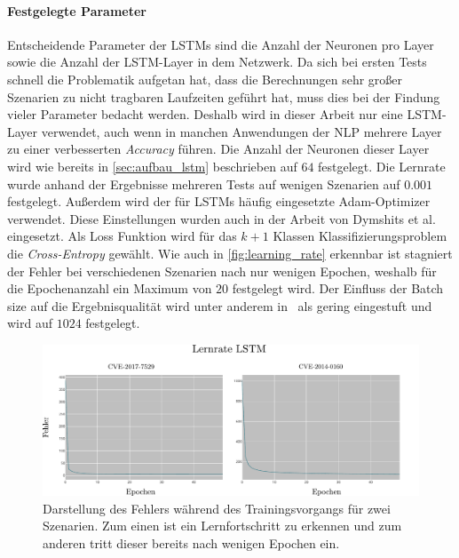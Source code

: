             \paragraph{Festgelegte Parameter}
                Entscheidende Parameter der \acp{LSTM} sind die Anzahl der Neuronen pro Layer sowie die Anzahl der \ac{LSTM}-Layer in dem Netzwerk.
                Da sich bei ersten Tests schnell die Problematik aufgetan hat, dass die Berechnungen sehr großer Szenarien zu nicht tragbaren Laufzeiten geführt hat, muss dies bei der Findung vieler Parameter bedacht werden.
                Deshalb wird in dieser Arbeit nur eine \ac{LSTM}-Layer verwendet, auch wenn in manchen Anwendungen der \ac{NLP} mehrere Layer zu einer verbesserten \textit{Accuracy} führen.\cite{LSTMHYPERAUFA2020}
                Die Anzahl der Neuronen dieser Layer wird wie bereits in \autoref{sec:aufbau_lstm} beschrieben auf $64$ festgelegt.
                Die Lernrate wurde anhand der Ergebnisse mehreren Tests auf wenigen Szenarien auf $0.001$ festgelegt.
                Außerdem wird der für \acp{LSTM} häufig eingesetzte Adam-Optimizer verwendet.
                Diese Einstellungen wurden auch in der Arbeit von Dymshits et al.~\cite{LSTMDYMSHITS2017} eingesetzt.
                Als Loss Funktion wird für das $k+1$ Klassen Klassifizierungsproblem die \textit{Cross-Entropy} gewählt.
                Wie auch in \autoref{fig:learning_rate} erkennbar ist stagniert der Fehler bei verschiedenen Szenarien nach nur wenigen Epochen, weshalb für die Epochenanzahl ein Maximum von $20$ festgelegt wird.
                Der Einfluss der Batch size auf die Ergebnisqualität wird unter anderem in~\cite{LSTMBENCHBREUEL2015} als gering eingestuft und wird auf $1024$ festgelegt.
                 
                
                \begin{figure}
                    \centering
                    \includegraphics[width=\textwidth]{images/learning_rate.pdf}
                    \caption[Parameterwahl - Fehler während des Trainings]{Darstellung des Fehlers während des Trainingsvorgangs für zwei Szenarien.
                             Zum einen ist ein Lernfortschritt zu erkennen und zum anderen tritt dieser bereits nach wenigen Epochen ein.}\label{fig:learning_rate}
                \end{figure}

